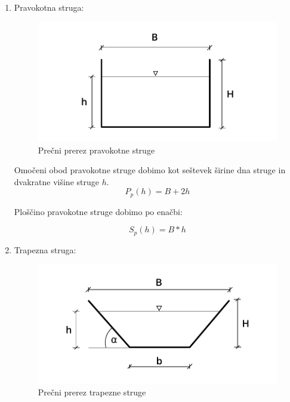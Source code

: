 \begin{enumerate}
	\item Pravokotna struga:
	
	\begin{figure}[ht!]
		\begin{centering}
			\includegraphics{slike/konsumpcijska_krivulja/rectangularChannel.pdf}		
			\caption{Prečni prerez pravokotne struge} \label{fig:pravokotna struga}
		\end{centering}
	\end{figure}
	

	Omočeni obod pravokotne struge dobimo kot seštevek širine dna struge in dvakratne višine struge $h$.
	\begin{equation}
	P_{p}(h) = B + 2h
	\end{equation}
	
	Ploščino pravokotne struge dobimo po enačbi:
	
	\begin{equation}
	S_{p}(h) = B * h
	\end{equation}
	
	\item Trapezna struga:
	
		\begin{figure}[ht!]
			\begin{centering}
				\includegraphics{slike/konsumpcijska_krivulja/trapezoidChannel.pdf}		
				\caption{Prečni prerez trapezne struge} \label{fig:trapezna struga}
			\end{centering}
		\end{figure}
	

\end{enumerate}
